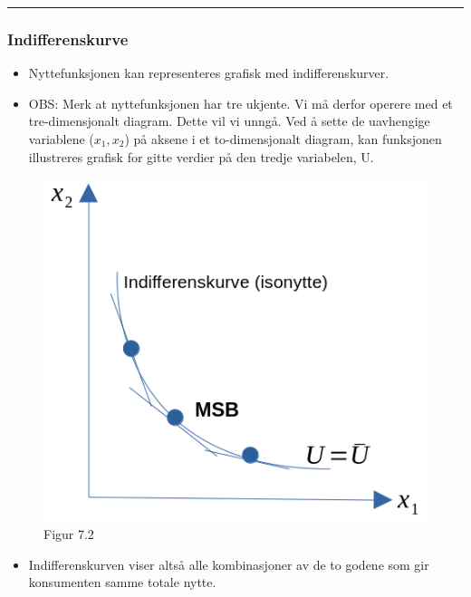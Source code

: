 \documentclass[
  letterpaper,
  DIV=11,
  numbers=noendperiod]{scrartcl}
\providecommand{\tightlist}{%
  \setlength{\itemsep}{0pt}\setlength{\parskip}{0pt}}\usepackage{longtable,booktabs,array}
\begin{document}
\begin{center}\rule{0.5\linewidth}{0.5pt}\end{center}

\subsubsection{Indifferenskurve}\label{indifferenskurve}

\begin{itemize}
\tightlist
\item
  Nyttefunksjonen kan representeres grafisk med indifferenskurver.
\item
  OBS: Merk at nyttefunksjonen har tre ukjente. Vi må derfor operere med
  et tre-dimensjonalt diagram. Dette vil vi unngå. Ved å sette de
  uavhengige variablene (\(x_{1},x_{2}\)) på aksene i et to-dimensjonalt
  diagram, kan funksjonen illustreres grafisk for gitte verdier på den
  tredje variabelen, U.
\end{itemize}

\begin{figure}[H]

{\centering \includegraphics[width=1\textwidth,height=\textheight]{drawio/indkurve.png}

}

\caption{Figur 7.2}

\end{figure}%

\begin{itemize}
\tightlist
\item
  Indifferenskurven viser altså alle kombinasjoner av de to godene som
  gir konsumenten samme totale nytte.
\end{itemize}
\end{document}

